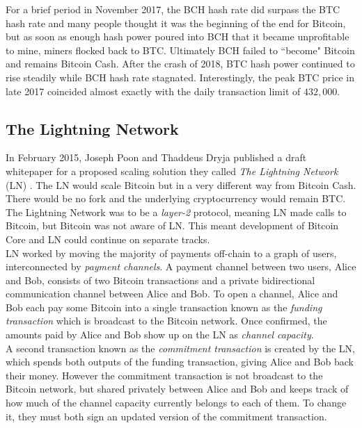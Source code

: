 \documentclass{report}
\begin{document}
		For a brief period in November 2017, the BCH  hash rate did surpass the BTC hash rate  and many people thought it was the beginning of the end for Bitcoin, but as soon as enough hash power poured into BCH that it became unprofitable to mine,  miners flocked back to BTC. Ultimately BCH failed to ``become" Bitcoin and remains Bitcoin Cash. After the crash of 2018, BTC hash power continued to rise steadily while BCH hash rate stagnated. Interestingly, the peak BTC price in late 2017 coincided almost exactly with the daily transaction limit of $432,000$. \\
		
		\subsection{The Lightning Network}
		
		In February 2015, Joseph Poon and Thaddeus Dryja published a draft whitepaper for a proposed scaling solution they called \textit{The Lightning Network} (LN)  \cite{ln}. The LN would scale Bitcoin but in a very different way from Bitcoin Cash.  There would be no fork and the underlying cryptocurrency would remain BTC. The Lightning Network was to be a \textit{layer-2} protocol, meaning LN made calls to Bitcoin, but Bitcoin was not aware of LN. This meant development of Bitcoin Core  and LN could continue on separate tracks. \\
		
		LN worked by moving the majority of payments off-chain to a graph  of users, interconnected by \textit{payment channels}.  A payment channel between two users, Alice and Bob, consists of two Bitcoin transactions and a private bidirectional communication channel between Alice and Bob. To open a channel, Alice and Bob each pay some Bitcoin into a single transaction known as the \textit{funding transaction}  which is broadcast to the Bitcoin network. Once confirmed, the amounts paid by Alice and Bob show up on the LN as \textit{channel capacity}. \\
		
		
		A second transaction known as the \textit{commitment transaction}  is created by the LN, which spends both outputs of the funding transaction, giving Alice and Bob back their money. However the commitment transaction is not broadcast  to the Bitcoin network, but shared privately between Alice and Bob and keeps track of how much of the channel capacity currently belongs to each of them. To change it, they must both sign an updated version of the commitment transaction. \\
		
\end{document}
